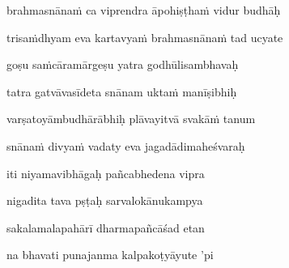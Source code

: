 
brahmasnānaṁ ca viprendra āpohiṣṭhaṁ vidur budhāḥ\thinspace{\dandab} \dontdisplaylinenum
{}

trisaṁdhyam eva kartavyaṁ brahmasnānaṁ tad ucyate \veg\dontdisplaylinenum



goṣu saṁcāramārgeṣu yatra godhūlisambhavaḥ\thinspace{\dandab} \dontdisplaylinenum

tatra gatvāvasīdeta snānam uktaṁ manīṣibhiḥ \veg\dontdisplaylinenum
{}



varṣatoyāmbudhārābhiḥ plāvayitvā svakāṁ tanum\thinspace{\dandab} \dontdisplaylinenum
{}

snānaṁ divyaṁ vadaty eva jagadādimaheśvaraḥ \veg\dontdisplaylinenum
{}

\ujvers\nemsloka 
iti niyamavibhāgaḥ pañcabhedena vipra
\dontdisplaylinenum
{}

\nemslokab 
nigadita tava pṣṭaḥ sarvalokānukampya \danda\dontdisplaylinenum
{}

\nemslokac 
sakalamalapahārī dharmapañcāśad etan
\dontdisplaylinenum
{}

\nemslokad 
na bhavati punajanma kalpakoṭyāyute 'pi \veg\dontdisplaylinenum

\vers
{}


